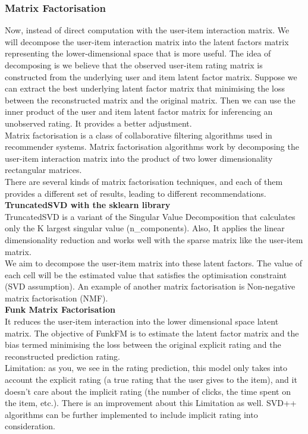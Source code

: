 \subsubsection{Matrix Factorisation}
\label{Matrix Factorisation}
\label{MatrixFac}
Now, instead of direct computation with the user-item interaction matrix. We will decompose the user-item interaction matrix into the latent factors matrix representing the lower-dimensional space that is more useful. The idea of decomposing is we believe that the observed user-item rating matrix is constructed from the underlying user and item latent factor matrix. Suppose we can extract the best underlying latent factor matrix that minimising the loss between the reconstructed matrix and the original matrix. 
Then we can use the inner product of the user and item latent factor matrix for inferencing an unobserved rating. It provides a better adjustment.
\\Matrix factorisation is a class of collaborative filtering algorithms used in recommender systems. Matrix factorisation algorithms work by decomposing the user-item interaction matrix into the product of two lower dimensionality rectangular matrices.
\\There are several kinds of matrix factorisation techniques, and each of them provides a different set of results, leading to different recommendations.
\\ \textbf{TruncatedSVD with the sklearn library}
\\TruncatedSVD is a variant of the Singular Value Decomposition that calculates only the K largest singular value (n\_components). Also, It applies the linear dimensionality reduction and works well with the sparse matrix like the user-item matrix.
\\We aim to decompose the user-item matrix into these latent factors. The value of each cell will be the estimated value that satisfies the optimisation constraint (SVD assumption). An example of another matrix factorisation is Non-negative matrix factorisation (NMF).
\\ \textbf{Funk Matrix Factorisation}
\\It reduces the user-item interaction into the lower dimensional space latent matrix. The objective of FunkFM is to estimate the latent factor matrix and the bias termed minimising the loss between the original explicit rating and the reconstructed prediction rating.
\\ Limitation: as you, we see in the rating prediction, this model only takes into account the explicit rating (a true rating that the user gives to the item), and it doesn't care about the implicit rating (the number of clicks, the time spent on the item, etc.). There is an improvement about this Limitation as well. SVD++ algorithms can be further implemented to include implicit rating into consideration.
